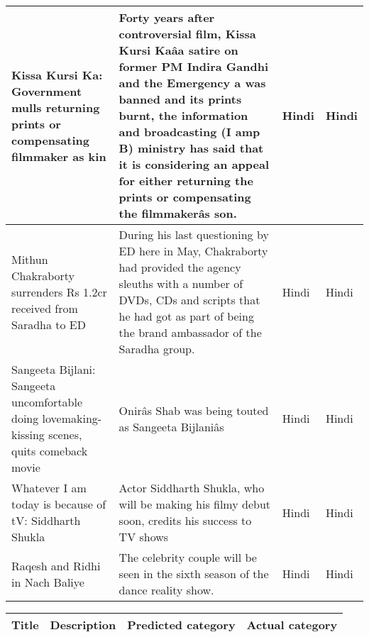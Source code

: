 \begin{itemize}
\begin{table}
\begin{center}
\begin{longtable}{|p{3cm}|p{7cm}|p{1.5cm}|p{1.5cm}|}
  Kissa Kursi Ka: Government mulls returning prints or compensating filmmaker as kin&  Forty years after controversial film, Kissa Kursi Kaâa satire on former PM Indira Gandhi and the Emergency a was banned and its prints burnt, the information and broadcasting (I amp B) ministry has said that it is considering an appeal for either returning the prints or compensating the filmmakerâs son.&   Hindi&   Hindi\\ \hline
  Mithun Chakraborty surrenders Rs 1.2cr received from Saradha to ED&  During his last questioning by ED here in May, Chakraborty had provided the agency sleuths with a number of DVDs, CDs and scripts that he had got as part of being the brand ambassador of the Saradha group.&   Hindi&   Hindi\\ \hline
  Sangeeta Bijlani: Sangeeta uncomfortable doing lovemaking-kissing scenes, quits comeback movie&   Onirâs Shab was being touted as Sangeeta Bijlaniâs&   Hindi&   Hindi\\ \hline
  Whatever I am today is because of tV: Siddharth Shukla&  Actor Siddharth Shukla, who will be making his filmy debut soon, credits his success to TV shows&   Hindi&   Hindi\\ \hline
  Raqesh and Ridhi in Nach Baliye&  The celebrity couple will be seen in the sixth season of the dance reality show.&   Hindi&   Hindi\\ \hline  
\end{longtable}
\end{center}
\end{table}

\begin{table}
\newpage
\label{}
\begin{center}
\begin{longtable}{|p{3cm}|p{7cm}|p{1.5cm}|p{1.5cm}|}
\hline
\textbf{Title} & \textbf{Description} & \textbf{Predicted category} & \textbf{Actual category} \\ \hline


\end{longtable}
\end{center}
\end{table}
\end{itemize}
